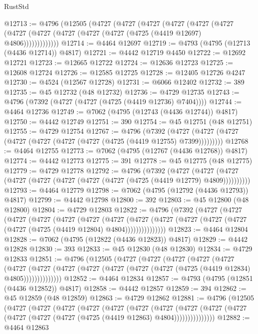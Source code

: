 \begin{lexlean}{RustStd}
\begin{coremodule}
@12713 := @4796
    (@12505
      (@4727
        (@4727
          (@4727
            (@4727
              (@4727
                (@4727 (@4727 (@4727 (@4727 (@4727 (@4727 (@4725 (@4419 @12697) @4806)))))))))))))
@12714 := @4464 @12697
@12719 := @4793 (@4795 (@12713 (@4436 @12714)) @4817)
@12721 := @4442 @12719 @4450
@12722 := @12692 @12721
@12723 := @12665 @12722
@12724 := @12636 @12723
@12725 := @12608 @12724
@12726 := @12585 @12725
@12728 := @12405 @12726 @4247
@12730 := @4524 (@12567 @12728)
@12731 := @6066 @12402
@12732 := 389
@12735 := @45 @12732 (@48 @12732)
@12736 := @4729 @12735
@12743 := @4796 (@7392 (@4727 (@4727 (@4725 (@4419 @12736) @7404))))
@12744 := @4464 @12736
@12749 := @7062 (@4795 (@12743 (@4436 @12744)) @4817)
@12750 := @4442 @12749
@12751 := 390
@12754 := @45 @12751 (@48 @12751)
@12755 := @4729 @12754
@12767 := @4796
    (@7392 (@4727 (@4727 (@4727 (@4727 (@4727 (@4727 (@4727 (@4725 (@4419 @12755) @7399)))))))))
@12768 := @4464 @12755
@12773 := @7062 (@4795 (@12767 (@4436 @12768)) @4817)
@12774 := @4442 @12773
@12775 := 391
@12778 := @45 @12775 (@48 @12775)
@12779 := @4729 @12778
@12792 := @4796
    (@7392
      (@4727 (@4727 (@4727 (@4727 (@4727 (@4727 (@4727 (@4727 (@4725 (@4419 @12779) @4809))))))))))
@12793 := @4464 @12779
@12798 := @7062 (@4795 (@12792 (@4436 @12793)) @4817)
@12799 := @4442 @12798
@12800 := 392
@12803 := @45 @12800 (@48 @12800)
@12804 := @4729 @12803
@12822 := @4796
    (@7392
      (@4727
        (@4727
          (@4727
            (@4727
              (@4727
                (@4727
                  (@4727
                    (@4727
                      (@4727 (@4727 (@4727 (@4727 (@4727 (@4725 (@4419 @12804) @4804)))))))))))))))
@12823 := @4464 @12804
@12828 := @7062 (@4795 (@12822 (@4436 @12823)) @4817)
@12829 := @4442 @12828
@12830 := 393
@12833 := @45 @12830 (@48 @12830)
@12834 := @4729 @12833
@12851 := @4796
    (@12505
      (@4727
        (@4727
          (@4727
            (@4727
              (@4727
                (@4727
                  (@4727
                    (@4727 (@4727 (@4727 (@4727 (@4727 (@4725 (@4419 @12834) @4805))))))))))))))
@12852 := @4464 @12834
@12857 := @4793 (@4795 (@12851 (@4436 @12852)) @4817)
@12858 := @4442 @12857
@12859 := 394
@12862 := @45 @12859 (@48 @12859)
@12863 := @4729 @12862
@12881 := @4796
    (@12505
      (@4727
        (@4727
          (@4727
            (@4727
              (@4727
                (@4727
                  (@4727
                    (@4727
                      (@4727 (@4727 (@4727 (@4727 (@4727 (@4725 (@4419 @12863) @4804)))))))))))))))
@12882 := @4464 @12863

\end{coremodule}
\end{lexlean}
